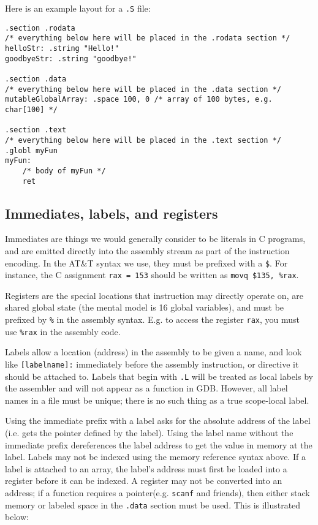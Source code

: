 \documentclass[11pt]{article}
\begin{document}
Here is an example layout for a \texttt{.S} file:

\begin{lstlisting}
.section .rodata
/* everything below here will be placed in the .rodata section */
helloStr: .string "Hello!"
goodbyeStr: .string "goodbye!"

.section .data
/* everything below here will be placed in the .data section */
mutableGlobalArray: .space 100, 0 /* array of 100 bytes, e.g. char[100] */

.section .text
/* everything below here will be placed in the .text section */
.globl myFun
myFun:
    /* body of myFun */
    ret
\end{lstlisting}

\subsection{Immediates, labels, and registers}

Immediates are things we would generally consider to be literals in C programs, and are
emitted directly into the assembly stream as part of the instruction encoding. In the
AT\&T syntax we use, they must be prefixed with a \texttt{\$}. For instance, the C
assignment \texttt{rax = 153} should be written as \texttt{movq \$135, \%rax}.

Registers are the special locations that instruction may directly operate on, are shared
global state (the mental model is 16 global variables), and must be prefixed by
\texttt{\%} in the assembly syntax. E.g. to access the register \texttt{rax}, you must use
\texttt{\%rax} in the assembly code.

Labels allow a location (address) in the assembly to be given a name, and look like
\texttt{[labelname]:} immediately before the assembly instruction, or directive it should
be attached to. Labels that begin with \texttt{.L} will be treated as local labels by the
assembler and will not appear as a function in GDB. However, all label names in a file
must be unique; there is no such thing as a true scope-local label.

Using the immediate prefix with a label asks for the absolute address of the label (i.e.
gets the pointer defined by the label). Using the label name without the immediate prefix
dereferences the label address to get the value in memory at the label. Labels may not be
indexed using the memory reference syntax above. If a label is attached to an array, the
label's address must first be loaded into a register before it can be indexed. A register
may not be converted into an address; if a function requires a pointer(e.g. \texttt{scanf}
and friends), then either stack memory or labeled space in the \texttt{.data} section must
be used. This is illustrated below:
\end{document}

